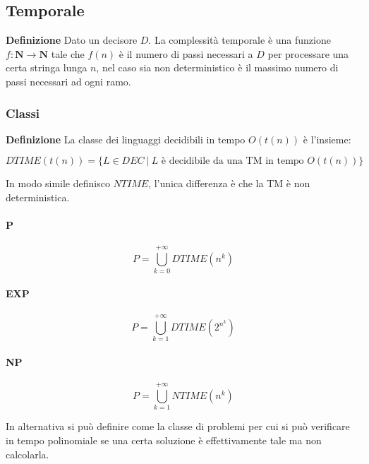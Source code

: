 \documentclass{article}
\begin{document}
\subsection{Temporale}

\textbf{Definizione} Dato un decisore $D$. La complessità temporale è una funzione $f:\mathbf{N}\rightarrow\mathbf{N}$ tale che $f(n)$ è il numero di passi necessari a $D$ per processare una certa stringa lunga $n$, nel caso sia non deterministico è il massimo numero di passi necessari ad ogni ramo.\newline

\subsubsection{Classi}

\noindent\textbf{Definizione} La classe dei linguaggi decidibili in tempo $O(t(n))$ è l'insieme:

$$DTIME(t(n))=\{L\in DEC\ |\ L\text{ è decidibile da una TM in tempo }O(t(n))\}$$\newline

\noindent In modo simile definisco $NTIME$, l'unica differenza è che la TM è non deterministica.

\newpage

\paragraph{P}

$$P=\bigcup_{k=0}^{+\infty}DTIME(n^k)$$\newline

\paragraph{EXP}

$$P=\bigcup_{k=1}^{+\infty}DTIME(2^{n^k})$$\newline

\paragraph{NP}

$$P=\bigcup_{k=1}^{+\infty}NTIME(n^k)$$\newline

\noindent In alternativa si può definire come la classe di problemi per cui si può verificare in tempo polinomiale se una certa soluzione è effettivamente tale ma non calcolarla.\newline
\end{document}
